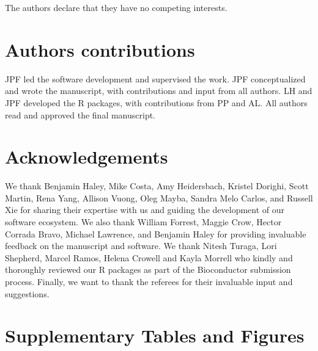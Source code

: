 \documentclass[pdftex,english,10pt]{article}
\begin{document}
{The authors declare that they have no competing interests.

\section*{Authors contributions}

JPF led the software development and supervised the work.
JPF conceptualized and wrote the manuscript, with contributions and input from all authors. 
LH and JPF developed the R packages, with contributions from PP and AL. 
All authors read and approved the final manuscript.

\section*{Acknowledgements}

We thank Benjamin Haley, Mike Costa, Amy Heidersbach, Kristel Dorighi, Scott Martin, Rena Yang, Allison Vuong, Oleg Mayba, Sandra Melo Carlos, and Russell Xie for sharing their expertise with us and guiding the development of our software ecosystem. We also thank William Forrest, Maggie Crow, Hector Corrada Bravo, Michael Lawrence, and Benjamin Haley for providing invaluable feedback on the manuscript and software. We thank Nitesh Turaga, Lori Shepherd, Marcel Ramos, Helena Crowell and Kayla Morrell who kindly and thoroughly reviewed our R packages as part of the Bioconductor submission process. Finally, we want to thank the referees for their invaluable input and suggestions. 








\clearpage
\section*{Supplementary Tables and Figures}

\renewcommand{\figurename}{Supplementary Figure}
\setcounter{figure}{0}
\makeatletter 
\renewcommand{\thefigure}{S\@arabic\c@figure}
\makeatother


\renewcommand{\tablename}{Supplementary Table}
\setcounter{table}{0}
\makeatletter 
\renewcommand{\thetable}{S\@arabic\c@table}
\makeatother






}
\end{document}
